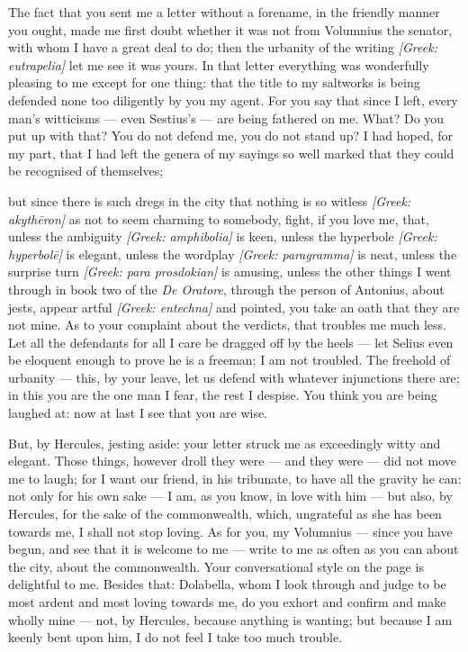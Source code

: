 

 The fact that you sent me a letter without a forename, in the friendly manner you ought, made me first doubt whether it was not from Volumnius the senator, with whom I have a great deal to do; then the urbanity of the writing \textit{[Greek: eutrapelia]} let me see it was yours. In that letter everything was wonderfully pleasing to me except for one thing: that the title to my saltworks is being defended none too diligently by you my agent. For you say that since I left, every man's witticisms --- even Sestius's --- are being fathered on me. What? Do you put up with that? You do not defend me, you do not stand up? I had hoped, for my part, that I had left the genera of my sayings so well marked that they could be recognised of themselves;

 but since there is such dregs in the city that nothing is so witless \textit{[Greek: akythēron]} as not to seem charming to somebody, fight, if you love me, that, unless the ambiguity \textit{[Greek: amphibolia]} is keen, unless the hyperbole \textit{[Greek: hyperbolē]} is elegant, unless the wordplay \textit{[Greek: paragramma]} is neat, unless the surprise turn \textit{[Greek: para prosdokian]} is amusing, unless the other things I went through in book two of the \textit{De Oratore}, through the person of Antonius, about jests, appear artful \textit{[Greek: entechna]} and pointed, you take an oath that they are not mine. As to your complaint about the verdicts, that troubles me much less. Let all the defendants for all I care be dragged off by the heels --- let Selius even be eloquent enough to prove he is a freeman; I am not troubled. The freehold of urbanity --- this, by your leave, let us defend with whatever injunctions there are; in this you are the one man I fear, the rest I despise. You think you are being laughed at: now at last I see that you are wise.

 But, by Hercules, jesting aside: your letter struck me as exceedingly witty and elegant. Those things, however droll they were --- and they were --- did not move me to laugh; for I want our friend, in his tribunate, to have all the gravity he can: not only for his own sake --- I am, as you know, in love with him --- but also, by Hercules, for the sake of the commonwealth, which, ungrateful as she has been towards me, I shall not stop loving. As for you, my Volumnius --- since you have begun, and see that it is welcome to me --- write to me as often as you can about the city, about the commonwealth. Your conversational style on the page is delightful to me. Besides that: Dolabella, whom I look through and judge to be most ardent and most loving towards me, do you exhort and confirm and make wholly mine --- not, by Hercules, because anything is wanting; but because I am keenly bent upon him, I do not feel I take too much trouble.
